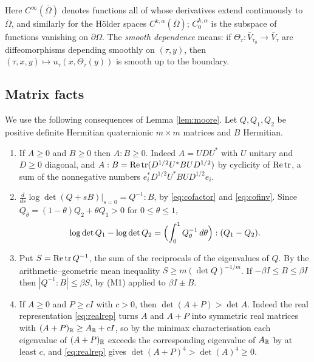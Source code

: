 Here $C^\infty(\overline\Omega)$ denotes functions all of whose derivatives extend continuously to
$\overline\Omega$, and similarly for the H\"older spaces $C^{k,\alpha}(\overline\Omega)$; $C^{k,\alpha}_0$ is
the subspace of functions vanishing on $\partial\Omega$. The \emph{smooth dependence} means: if
$\Theta_\tau:\overline V_{\tau_0}\to\overline V_\tau$ are diffeomorphisms depending smoothly on $(\tau,y)$, then
$(\tau,x,y)\mapsto u_\tau(x,\Theta_\tau(y))$ is smooth up to the boundary.

\subsection{Matrix facts}
We use the following consequences of Lemma \ref{lem:moore}. Let $Q,Q_1,Q_2$ be positive definite
Hermitian quaternionic $m\times m$ matrices and $B$ Hermitian.
\begin{enumerate}[label=(M\arabic*)]
\item If $A\ge0$ and $B\ge0$ then $A:B\ge0$. Indeed $A=UDU^*$ with $U$ unitary and $D\ge0$ diagonal, and
$A:B=\operatorname{Re}\operatorname{tr}(D^{1/2}U^*BUD^{1/2})$ by cyclicity of $\operatorname{Re}\operatorname{tr}$, a sum of the nonnegative numbers
$e_i^*D^{1/2}U^*BUD^{1/2}e_i$.
\item $\frac{d}{ds}\log\det(Q+sB)|_{s=0}=Q^{-1}:B$, by \eqref{eq:cofactor} and \eqref{eq:cofinv}. Since
$Q_\theta=(1-\theta)Q_2+\theta Q_1>0$ for $0\le\theta\le1$,
\begin{equation}\label{eq:logdiff}
\log\det Q_1-\log\det Q_2=\Bigl(\int_0^1Q_\theta^{-1}\,d\theta\Bigr):(Q_1-Q_2).
\end{equation}
\item Put $S=\operatorname{Re}\operatorname{tr} Q^{-1}$, the sum of the reciprocals of the eigenvalues of $Q$. By the
arithmetic--geometric mean inequality $S\ge m(\det Q)^{-1/m}$. If $-\beta I\le B\le\beta I$ then
$|Q^{-1}:B|\le\beta S$, by (M1) applied to $\beta I\pm B$.
\item If $A\ge0$ and $P\ge cI$ with $c>0$, then $\det(A+P)>\det A$. Indeed the real representation
\eqref{eq:realrep} turns $A$ and $A+P$ into symmetric real matrices with $(A+P)_{\mathbb{R}}\ge A_{\mathbb{R}}+cI$, so by the
minimax characterisation each eigenvalue of $(A+P)_{\mathbb{R}}$ exceeds the corresponding eigenvalue of $A_{\mathbb{R}}$
by at least $c$, and \eqref{eq:realrep} gives $\det(A+P)^4>\det(A)^4\ge0$.
\end{enumerate}


